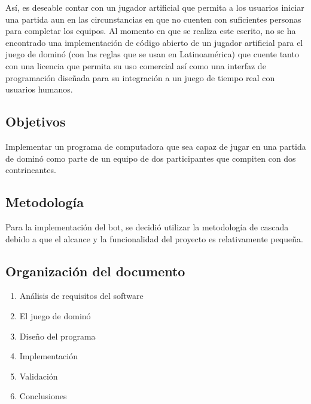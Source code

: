 Así, es deseable contar con un jugador artificial que permita a los usuarios
iniciar una partida aun en las circunstancias en que no cuenten con suficientes
personas para completar los equipos. Al momento en que se realiza este escrito,
no se ha encontrado una implementación de código abierto de un jugador
artificial para el juego de dominó (con las reglas que se usan en Latinoamérica)
que cuente tanto con una licencia que permita su uso comercial así como una
interfaz de programación diseñada para su integración a un juego de tiempo real
con usuarios humanos.



\subsection{Objetivos}

Implementar un programa de computadora que sea capaz de jugar en una partida de
dominó como parte de un equipo de dos participantes que compiten con dos
contrincantes.

\subsection{Metodología}

Para la implementación del bot, se decidió utilizar la metodología de cascada
debido a que el alcance y la funcionalidad del proyecto es relativamente
pequeña.

\subsection{Organización del documento}
\begin{enumerate}
    \item Análisis de requisitos del software
    \item El juego de dominó
    \item Diseño del programa
    \item Implementación
    \item Validación
    \item Conclusiones
\end{enumerate}


